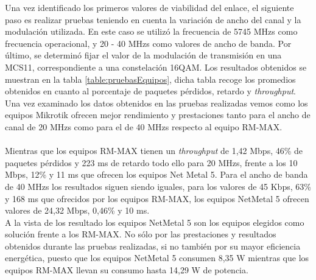  Una vez identificado los primeros valores de viabilidad del enlace, el siguiente paso es realizar pruebas teniendo en cuenta la variación de ancho del canal y la modulación utilizada. En este caso se utilizó la frecuencia de 5745 MHzs como frecuencia operacional, y 20 - 40 MHzs como valores de ancho de banda. Por último, se determinó fijar el valor de la modulación de transmisión en una MCS11, correspondiente a una constelación 16QAM. Los resultados obtenidos se muestran en la tabla \ref{table:pruebasEquipos}, dicha tabla recoge los promedios obtenidos en cuanto al porcentaje de paquetes pérdidos, retardo y \textit{throughput}.\\ 
Una vez examinado los datos obtenidos en las pruebas realizadas vemos como los equipos Mikrotik ofrecen mejor rendimiento y prestaciones tanto para el ancho de canal de 20 MHzs como para el de 40 MHzs respecto al equipo RM-MAX. \\\\

Mientras que los equipos RM-MAX tienen un \textit{throughput} de 1,42 Mbps, 46\% de paquetes pérdidos y 223 ms de retardo todo ello para 20 MHzs, frente a los 10 Mbps, 12\% y 11 ms que ofrecen los equipos Net Metal 5. Para el ancho de banda de 40 MHzs los resultados siguen siendo iguales, para los valores de 45 Kbps, 63\% y 168 ms que ofrecidos por los equipos RM-MAX, los equipos NetMetal 5 ofrecen valores de 24,32 Mbps, 0,46\% y 10 ms.\\
A la vista de los resultado los equipos NetMetal 5 son los equipos elegidos como solución frente a los RM-MAX. No sólo por las prestaciones y resultados obtenidos durante las pruebas realizadas, si no también por su mayor eficiencia energética, puesto que los equipos NetMetal 5 consumen 8,35 W mientras que los equipos RM-MAX llevan su consumo hasta 14,29 W de potencia.

